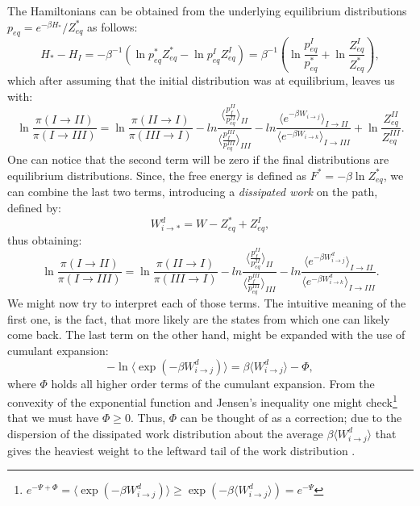 \documentclass[a4paper,12pt]{article}
\begin{document}
The Hamiltonians can be obtained from the underlying equilibrium distributions $p_{eq}= e^{-\beta H_*}/Z_{eq}^*$ as follows:
\begin{equation}
  H_*-H_I= -\beta^{-1}( \ln{p_{eq}^* Z_{eq}^*} -  \ln{p_{eq}^I Z_{eq}^I})= \beta^{-1}( \ln{\frac{p_{eq}^I}{p_{eq}^*}} + \ln{\frac{Z_{eq}^I}{Z_{eq}^*}}),
\end{equation}
which after assuming that the initial distribution was at equilibrium, leaves us with:
\begin{equation}
  \ln \frac{\pi(I \to II)}{\pi(I \to III)} =
  \ln \frac{\pi(II \to I)}{\pi(III \to I)} - ln \frac{ \langle \frac{p_{f}^{II}}{p_{eq}^{II}}  \rangle_{II}}{ \langle \frac{p_{f}^{III}}{p_{eq}^{III}}  \rangle_{III} }
  -ln \frac{\langle e^{ - \beta W_{i \to j}} \rangle_{I \to II}}{\langle e^{ - \beta W_{i \to k}} \rangle_{I \to III}} + \ln{\frac{Z_{eq}^{II}}{Z_{eq}^{III} }}.
\end{equation}
One can notice that the second term will be zero if the final distributions are equilibrium distributions. Since, the free energy is defined as $F^* = -\beta \ln Z_{eq}^*$, we can combine the last two terms, introducing a \textit{dissipated work} on the path, defined by:
\begin{equation}
  W_{i \to *}^d =W - Z_{eq}^* + Z_{eq}^I,
\end{equation}
thus obtaining:
\begin{equation}
\label{DissipationDrivenEq2}
  \ln \frac{\pi(I \to II)}{\pi(I \to III)} =
  \ln \frac{\pi(II \to I)}{\pi(III \to I)} - ln \frac{ \langle \frac{p_{f}^{II}}{p_{eq}^{II}}  \rangle_{II}}{ \langle \frac{p_{f}^{III}}{p_{eq}^{III}}  \rangle_{III} }
  -ln \frac{\langle e^{ - \beta W^d_{i \to j}} \rangle_{I \to II}}{\langle e^{ - \beta W^d_{i \to k}} \rangle_{I \to III}}.
\end{equation}
We might now try to interpret each of those terms. The intuitive meaning of the first one, is the fact, that more likely are the states from which one can likely come back. The last term on the other hand, might be expanded with the use of cumulant expansion:
\begin{equation}
  -\ln \langle \exp(-\beta W^d_{i \to j})\rangle= \beta \langle W^d_{i \to j} \rangle - \Phi,
\end{equation} 
where $\Phi$ holds all higher order terms of the cumulant expansion. From the convexity of the exponential function and Jensen's inequality one might check\footnote{$e^{-\Psi + \Phi}=\langle \exp(-\beta W^d_{i \to j}) \rangle \geq \exp(-\beta \langle W^d_{i \to j} \rangle)= e^{-\Psi}$} that we must have $\Phi \geq 0$. Thus, $\Phi$ can be thought of as a correction; due to the dispersion of the dissipated work distribution about the average $\beta \langle W^d_{i \to j} \rangle $ that gives the heaviest weight to the leftward tail of the work distribution \cite{Jarzynski:2006cq}.
\end{document}
